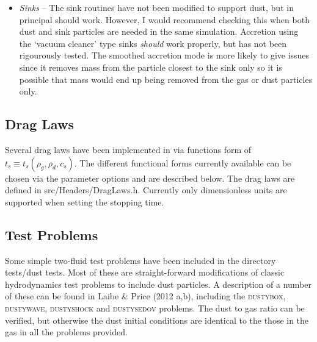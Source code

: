 \documentclass[a4paper]{article}
\begin{document}
\begin{itemize}
\item \emph{Sinks} -- The sink routines have not been modified to support dust, but in principal should work. However, I would recommend checking this when both dust and sink particles are needed in the same simulation. Accretion using  the `vacuum cleaner' type sinks \emph{should} work properly, but has not been rigourously tested. The smoothed accretion mode is more likely to give issues since it removes mass from the particle closest to the sink only so it is possible that mass would end up being removed from the gas or dust particles only. 

\end{itemize}

\subsection{Drag Laws}
Several drag laws have been implemented in via functions form of $t_s \equiv t_s (\rho_g , \rho_d , c_s)$. The different functional forms currently available can be chosen via the parameter options and are described below. The drag laws are defined in src/Headers/DragLaws.h. Currently only dimensionless units are supported when setting the stopping time.

\subsection{Test Problems}
Some simple two-fluid test problems have been included in the directory tests/dust tests. Most of these are straight-forward modifications of classic hydrodynamics test problems to include dust particles. A description of a number of these can be found in Laibe \& Price (2012 a,b), including the \textsc{dustybox}, \textsc{dustywave}, \textsc{dustyshock} and \textsc{dustysedov} problems. The dust to gas ratio can be verified, but otherwise the dust initial conditions are identical to the those in the gas in all the problems provided.
\end{document}
